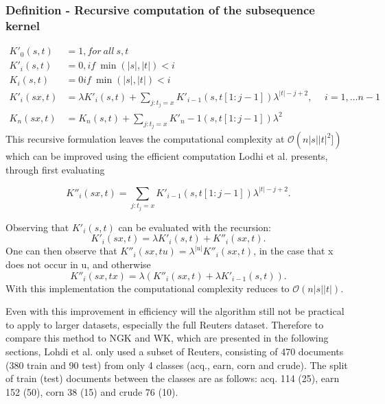 \subsubsection{Definition - Recursive computation of the subsequence kernel}
\begin{align*}
	K'_{0}(s,t) & = 1, for\ all\ s,t \\
	K'_i(s,t) & = 0, if\ \min(|s|,|t|) < i \\
	K_i(s,t) & = 0 if\ \min(|s|,|t|) < i \\
	K'_i(sx,t) & = \lambda K'_i(s,t) + \sum_{j:t_j=x} K'_{i-1}(s,t[1:j-1])\lambda^{|t|-j+2}, \hspace{15pt} i = 1, \dots n-1 \\	
	K_{n}(sx,t) & = K_n(s,t) + \sum_{j:t_j = x}K'_n-1(s,t[1:j-1])\lambda^2
\end{align*}  
This recursive formulation leaves the computational complexity at $ \mathcal{O}(n|s||t|^2]) $ which can be improved using the efficient computation Lodhi et al. presents, through first evaluating

\begin{equation*}\label{key}
K''_i(sx,t) = \sum_{j:t_j = x}K'_{i-1}(s,t[1:j-1])\lambda^{|t|-j+2}.
\end{equation*}

Observing that $ K'_i(s,t) $ can be evaluated with the recursion:
\begin{equation*}\label{key}
K'_i(sx,t) = \lambda K'_i(s,t) + K''_i(sx,t).
\end{equation*}
One can then observe that $ K''_i(sx,tu) = \lambda^{|u|}K''_i(sx,t)$, in the case that x does not occur in u, and otherwise 
\begin{equation*}\label{key}
K''_i(sx,tx) = \lambda \left( K''_i(sx,t) + \lambda K'_{i-1}(s,t) \right).
\end{equation*} 
With this implementation the computational complexity reduces to $ \mathcal{O}(n|s||t|) $.

Even with this improvement in efficiency will the algorithm still not be practical to apply to larger datasets, especially the full Reuters dataset. Therefore to compare this method to NGK and WK, which are presented in the following sections, Lohdi et al. only used a subset of Reuters, consisting of 470 documents (380 train and 90 test)  from only 4 classes (acq., earn, corn and crude). The split of train (test) documents between the classes are as follows: acq. 114 (25), earn 152 (50), corn 38 (15) and crude 76 (10).

